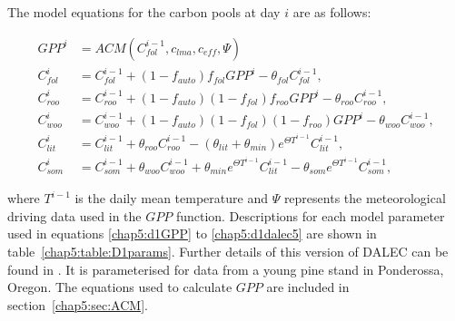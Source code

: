 The model equations for the carbon pools at day $i$ are as follows:

\begin{align}
GPP^{i} &= ACM(C_{fol}^{i-1}, c_{lma}, c_{eff}, \Psi) \label{chap5:d1GPP}
\\C_{fol}^{i}&=C_{fol}^{i-1}+(1-f_{auto})f_{fol}GPP^{i}-\theta_{fol}C_{fol}^{i-1},
\\C_{roo}^{i}&=C_{roo}^{i-1}+(1-f_{auto})(1-f_{fol})f_{roo}GPP^{i}-\theta_{roo}C_{roo}^{i-1}, 
\\C_{woo}^{i}&=C_{woo}^{i-1}+(1-f_{auto})(1-f_{fol})(1-f_{roo})GPP^{i}-\theta_{woo}C_{woo}^{i-1}, 
\\C_{lit}^{i}&=C_{lit}^{i-1}+\theta_{roo}C_{roo}^{i-1}-(\theta_{lit}+\theta_{min})e^{\Theta T^{i-1}}C_{lit}^{i-1}, 
\\C_{som}^{i}&=C_{som}^{i-1}+\theta_{woo}C_{woo}^{i-1}+\theta_{min}e^{\Theta T^{i-1}}C_{lit}^{i-1}-\theta_{som}e^{\Theta T^{i-1}}C_{som}^{i-1}, \label{chap5:d1dalec5}
\end{align}

where $T^{i-1}$ is the daily mean temperature and $\Psi$ represents the meteorological driving data used in the $GPP$ function. Descriptions for each model parameter used in equations \eqref{chap5:d1GPP} to \eqref{chap5:d1dalec5} are shown in table~\ref{chap5:table:D1params}. Further details of this version of DALEC can be found in \cite{williams2005improved}. It is parameterised for data from a young pine stand in Ponderossa, Oregon. The equations used to calculate $GPP$ are included in section~\ref{chap5:sec:ACM}. 

